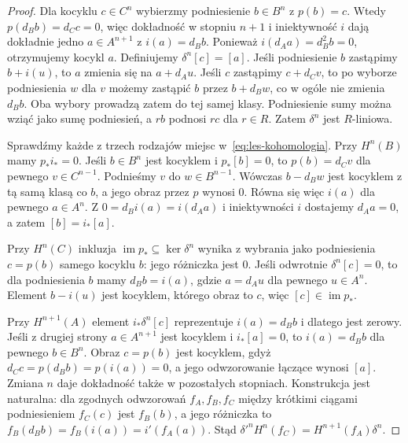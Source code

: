 \begin{proof}
Dla kocyklu $c\in C^n$ wybierzmy podniesienie
$b\in B^n$ z $p(b)=c$.
Wtedy $p(d_Bb)=d_Cc=0$, więc dokładność
w stopniu $n+1$ i iniektywność $i$
dają dokładnie jedno $a\in A^{n+1}$
z $i(a)=d_Bb$.
Ponieważ $i(d_Aa)=d_B^2b=0$,
otrzymujemy kocykl $a$.
Definiujemy $\delta^n[c]=[a]$.
Jeśli podniesienie $b$ zastąpimy $b+i(u)$,
to $a$ zmienia się na $a+d_Au$.
Jeśli $c$ zastąpimy $c+d_Cv$, to po
wyborze podniesienia $w$ dla $v$ możemy
zastąpić $b$ przez $b+d_Bw$,
co w ogóle nie zmienia $d_Bb$.
Oba wybory prowadzą zatem do tej
samej klasy. Podniesienie sumy można wziąć
jako sumę podniesień, a $rb$ podnosi $rc$ dla $r\in R$.
Zatem $\delta^n$ jest $R$-liniowa.

Sprawdźmy każde z trzech rodzajów miejsc
w~\eqref{eq:les-kohomologia}.
Przy $H^n(B)$ mamy $p_*i_*=0$.
Jeśli $b\in B^n$ jest kocyklem
i $p_*[b]=0$, to $p(b)=d_Cv$
dla pewnego $v\in C^{n-1}$.
Podnieśmy $v$ do $w\in B^{n-1}$.
Wówczas $b-d_Bw$ jest kocyklem
z tą samą klasą co $b$, a jego
obraz przez $p$ wynosi $0$.
Równa się więc $i(a)$ dla pewnego
$a\in A^n$. Z $0=d_Bi(a)=i(d_Aa)$
i iniektywności $i$ dostajemy
$d_Aa=0$, a zatem $[b]=i_*[a]$.

Przy $H^n(C)$ inkluzja
$\operatorname{im}p_*\subseteq\ker\delta^n$
wynika z wybrania jako podniesienia $c=p(b)$
samego kocyklu $b$: jego różniczka jest $0$.
Jeśli odwrotnie $\delta^n[c]=0$,
to dla podniesienia $b$ mamy $d_Bb=i(a)$,
gdzie $a=d_Au$ dla pewnego $u\in A^n$.
Element $b-i(u)$ jest kocyklem,
którego obraz to $c$, więc
$[c]\in\operatorname{im}p_*$.

Przy $H^{n+1}(A)$ element
$i_*\delta^n[c]$ reprezentuje
$i(a)=d_Bb$ i dlatego jest zerowy.
Jeśli z drugiej strony $a\in A^{n+1}$
jest kocyklem i $i_*[a]=0$,
to $i(a)=d_Bb$ dla pewnego
$b\in B^n$. Obraz $c=p(b)$ jest
kocyklem, gdyż $d_Cc=p(d_Bb)=p(i(a))=0$,
a jego odwzorowanie łączące wynosi $[a]$.
Zmiana $n$ daje dokładność także
w pozostałych stopniach. Konstrukcja jest naturalna:
dla zgodnych odwzorowań $f_A,f_B,f_C$ między krótkimi ciągami
podniesieniem $f_C(c)$ jest $f_B(b)$, a jego różniczka to
$f_B(d_Bb)=f_B(i(a))=i'(f_A(a))$.
Stąd $\delta'^n H^n(f_C)=H^{n+1}(f_A)\delta^n$.
\end{proof}

